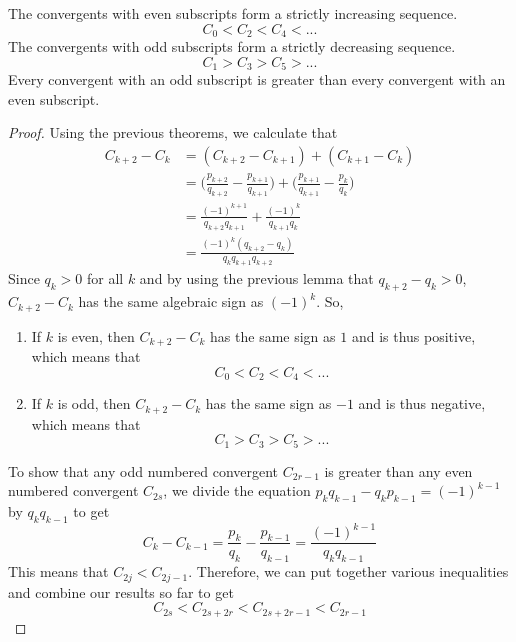 \documentclass{article}
\newcounter{theorem}[section]
\begin{document}
\begin{theorem}
  \label{thm:convergents-even-subscripts-form-strictly}
The convergents with even subscripts form a strictly increasing sequence. 
\begin{equation}
  C_0 < C_2 < C_4 < ...
\end{equation}
The convergents with odd subscripts form a strictly decreasing sequence. 
\begin{equation}
  C_1 > C_3 > C_5 > ...
\end{equation}
Every convergent with an odd subscript is greater than every convergent with an even subscript. 
\end{theorem}
\begin{proof}
Using the previous theorems, we calculate that
\begin{align*}
    C_{k+2} - C_k & = (C_{k+2} - C_{k+1}) + (C_{k+1} - C_k )\\
    & = \bigg( \frac{p_{k+2}}{q_{k+2}} - \frac{p_{k+1}}{q_{k+1}} \bigg) + \bigg( \frac{p_{k+1}}{q_{k+1}} - \frac{p_{k}}{q_{k}} \bigg) \\
    & = \frac{(-1)^{k+1}}{q_{k+2} q_{k+1}} + \frac{(-1)^k}{q_{k+1} q_k} \\
    & = \frac{(-1)^k (q_{k+2} - q_k)}{q_k q_{k+1} q_{k+2}}
\end{align*}
Since $q_k > 0$ for all $k$ and by using the previous lemma that $q_{k+2} - q_k > 0$, $C_{k+2} - C_{k}$ has the same algebraic sign as $(-1)^k$. So, 
\begin{enumerate}
    \item If $k$ is even, then $C_{k+2} - C_{k}$ has the same sign as $1$ and is thus positive, which means that
    \begin{equation}
      C_0 < C_2 < C_4 < ...
    \end{equation}
    \item If $k$ is odd, then $C_{k+2} - C_k$ has the same sign as $-1$ and is thus negative, which means that
    \begin{equation}
      C_1 > C_3 > C_5 > ...
    \end{equation}
\end{enumerate}
To show that any odd numbered convergent $C_{2r-1}$ is greater than any even numbered convergent $C_{2s}$, we divide the equation $p_k q_{k-1} - q_k p_{k-1} = (-1)^{k-1}$ by $q_k q_{k-1}$ to get
\begin{equation}
  C_k - C_{k-1} = \frac{p_k}{q_k} - \frac{p_{k-1}}{q_{k-1}} = \frac{(-1)^{k-1}}{q_k q_{k-1}}
\end{equation}
This means that $C_{2j} < C_{2j-1}$. Therefore, we can put together various inequalities and combine our results so far to get
\begin{equation}
  C_{2s} < C_{2s+2r} < C_{2s+2r-1} < C_{2r-1}
\end{equation}
\end{proof}
\end{document}
